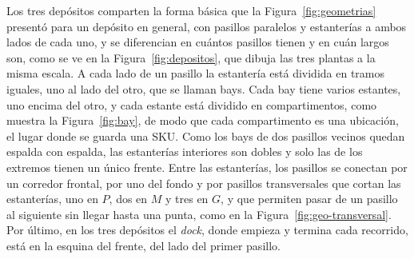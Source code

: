 Los tres depósitos comparten la forma básica que la Figura~\ref{fig:geometrias} presentó para un depósito en general, con pasillos paralelos y estanterías a ambos lados de cada uno, y se diferencian en cuántos pasillos tienen y en cuán largos son, como se ve en la Figura~\ref{fig:depositos}, que dibuja las tres plantas a la misma escala.
A cada lado de un pasillo la estantería está dividida en tramos iguales, uno al lado del otro, que se llaman bays.
Cada bay tiene varios estantes, uno encima del otro, y cada estante está dividido en compartimentos, como muestra la Figura~\ref{fig:bay}, de modo que cada compartimento es una ubicación, el lugar donde se guarda una SKU.
Como los bays de dos pasillos vecinos quedan espalda con espalda, las estanterías interiores son dobles y solo las de los extremos tienen un único frente.
Entre las estanterías, los pasillos se conectan por un corredor frontal, por uno del fondo y por pasillos transversales que cortan las estanterías, uno en $P$, dos en $M$ y tres en $G$, y que permiten pasar de un pasillo al siguiente sin llegar hasta una punta, como en la Figura~\ref{fig:geo-transversal}.
Por último, en los tres depósitos el \emph{dock}, donde empieza y termina cada recorrido, está en la esquina del frente, del lado del primer pasillo.

